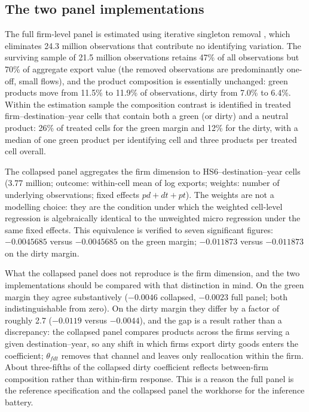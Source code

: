 \documentclass[12pt]{article}
\begin{document}
\subsection{The two panel implementations}

The full firm-level panel is estimated using iterative singleton removal
\citep{correia2017}, which eliminates 24.3 million observations that contribute no
identifying variation. The surviving sample of 21.5 million observations retains 47\% of
all observations but 70\% of aggregate export value (the removed observations are
predominantly one-off, small flows), and the product composition is essentially unchanged:
green products move from 11.5\% to 11.9\% of observations, dirty from 7.0\% to 6.4\%.
Within the estimation sample the composition contrast is identified in treated
firm--destination--year cells that contain both a green (or dirty) and a neutral product:
26\% of treated cells for the green margin and 12\% for the dirty, with a median of one
green product per identifying cell and three products per treated cell overall.

The collapsed panel aggregates the firm dimension to HS6--destination--year cells (3.77
million; outcome: within-cell mean of log exports; weights: number of underlying
observations; fixed effects $pd+dt+pt$). The weights are not a modelling choice: they
are the condition under which the weighted cell-level regression is algebraically
identical to the unweighted micro regression under the same fixed effects. This
equivalence is verified to seven significant figures: $-0.0045685$ versus $-0.0045685$
on the green margin; $-0.011873$ versus $-0.011873$ on the dirty margin.

What the collapsed panel does not reproduce is the firm dimension, and the two
implementations should be compared with that distinction in mind. On the green margin
they agree substantively ($-0.0046$ collapsed, $-0.0023$ full panel; both
indistinguishable from zero). On the dirty margin they differ by a factor of roughly
2.7 ($-0.0119$ versus $-0.0044$), and the gap is a result rather than a discrepancy:
the collapsed panel compares products across the firms serving a given destination--year,
so any shift in which firms export dirty goods enters the coefficient; $\theta_{fdt}$
removes that channel and leaves only reallocation within the firm. About three-fifths of
the collapsed dirty coefficient reflects between-firm composition rather than
within-firm response. This is a reason the full panel is the reference specification and
the collapsed panel the workhorse for the inference battery.
\end{document}
